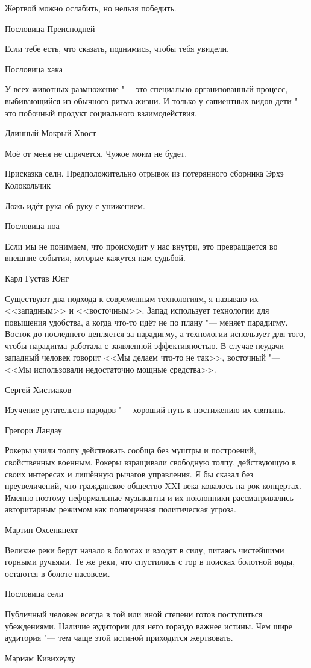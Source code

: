 \epigraph
{Жертвой можно ослабить, но нельзя победить.}
{Пословица Преисподней}

\epigraph
{Если тебе есть, что сказать, поднимись, чтобы тебя увидели.}
{Пословица хака}

\epigraph
{У всех животных размножение "--- это специально организованный процесс, выбивающийся из обычного ритма жизни.
И только у сапиентных видов дети "--- это побочный продукт социального взаимодействия.}
{Длинный-Мокрый-Хвост}

\epigraph
{Моё от меня не спрячется.
Чужое моим не будет.}
{Присказка сели.
Предположительно отрывок из потерянного сборника Эрхэ Колокольчик}

\epigraph
{Ложь идёт рука об руку с унижением.}
{Пословица ноа}

\epigraph
{Если мы не понимаем, что происходит у нас внутри, это превращается во внешние события, которые кажутся нам судьбой.}
{Карл Густав Юнг}

\epigraph
{Существуют два подхода к современным технологиям, я называю их <<западным>> и <<восточным>>.
Запад использует технологии для повышения удобства, а когда что-то идёт не по плану "--- меняет парадигму.
Восток до последнего цепляется за парадигму, а технологии использует для того, чтобы парадигма работала с заявленной эффективностью.
В случае неудачи западный человек говорит <<Мы делаем что-то не так>>, восточный "--- <<Мы использовали недостаточно мощные средства>>.}
{Сергей Хистиаков}

\epigraph{Изучение ругательств народов "--- хороший путь к постижению их святынь.}
{Грегори Ландау}

\epigraph
{Рокеры учили толпу действовать сообща без муштры и построений, свойственных военным.
Рокеры взращивали свободную толпу, действующую в своих интересах и лишённую рычагов управления.
Я бы сказал без преувеличений, что гражданское общество XXI века ковалось на рок-концертах.
Именно поэтому неформальные музыканты и их поклонники рассматривались авторитарным режимом как полноценная политическая угроза.}
{Мартин Охсенкнехт}

\epigraph
{Великие реки берут начало в болотах и входят в силу, питаясь чистейшими горными ручьями.
Те же реки, что спустились с гор в поисках болотной воды, остаются в болоте насовсем.}
{Пословица сели}

\epigraph
{Публичный человек всегда в той или иной степени готов поступиться убеждениями.
Наличие аудитории для него гораздо важнее истины.
Чем шире аудитория "--- тем чаще этой истиной приходится жертвовать.}
{Мариам Кивихеулу}

